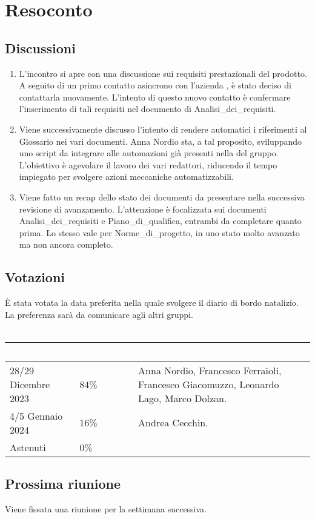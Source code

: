 \section{Resoconto} \label{sec:resoconto}
\subsection{Discussioni} \label{subsec:resdiscussione}
\begin{enumerate}
    \item L'incontro si apre con una discussione sui requisiti prestazionali del prodotto. A seguito di un primo contatto asincrono con l'azienda , è stato deciso di contattarla nuovamente. L'intento di questo nuovo contatto è confermare l'inserimento di tali requisiti nel documento di Analisi\_dei\_requisiti.
    \item Viene successivamente discusso l'intento di rendere automatici i riferimenti al Glossario nei vari documenti. Anna Nordio sta, a tal proposito, sviluppando uno script da integrare alle automazioni già presenti nella  del gruppo. L'obiettivo è agevolare il lavoro dei vari redattori, riducendo il tempo impiegato per svolgere azioni meccaniche automatizzabili.
    \item Viene fatto un recap dello stato dei documenti da presentare nella successiva revisione di avanzamento. L'attenzione è focalizzata sui documenti Analisi\_dei\_requisiti e Piano\_di\_qualifica, entrambi da completare quanto prima. Lo stesso vale per Norme\_di\_progetto, in uno stato molto avanzato ma non ancora completo.
\end{enumerate}

\subsection{Votazioni} \label{subsec:resvotazione}
     È stata votata la data preferita nella quale svolgere il diario di bordo natalizio. La preferenza sarà da comunicare agli altri gruppi. \\\\
        \begingroup
            \setlength{\tabcolsep}{10pt}
            \renewcommand{\arraystretch}{1.5}
            \begin{tabularx}{0.93\textwidth}{| l | l | X |}
                 \hline
                 \rowcolor{headerrow}\textbf{\textcolor{white}{Proposta}} & \textbf{\textcolor{white}{Sommario}} & \textbf{\textcolor{white}{Mittente}} \\
                 \hline
                 28/29 Dicembre 2023 & 84\%  & Anna Nordio, Francesco Ferraioli, Francesco Giacomuzzo, Leonardo Lago, Marco Dolzan. \\
                 \hline
                 4/5 Gennaio 2024 & 16\% & Andrea Cecchin. \\
                 \hline
                 Astenuti & 0\% &  \\
                 \hline
            \end{tabularx}
        \endgroup

\subsection{Prossima riunione} \label{subsec:riunione}
Viene fissata una riunione per la settimana successiva.
